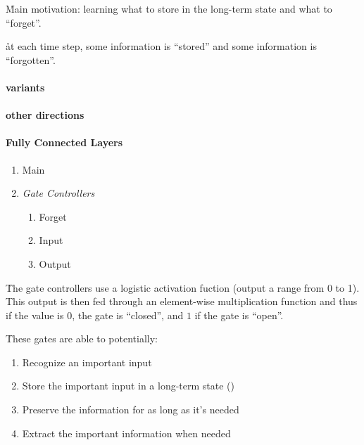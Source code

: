 \r{Main motivation: learning what to store in the long-term state and what to ``forget''.}

\r{at each time step, some information is ``stored'' and some information is ``forgotten''.}

\paragraph{variants}





\paragraph{other directions}


\paragraph{Fully Connected Layers}


\begin{enumerate}[noitemsep,topsep=0pt]
	\item Main
	\item \textit{Gate Controllers}
	\begin{enumerate}[noitemsep,topsep=0pt]
		\item Forget
		\item Input
		\item Output
	\end{enumerate}
\end{enumerate}

\r{The gate controllers use a logistic activation fuction (output a range from 0 to 1). This output is then fed through an element-wise multiplication function and thus if the value is $0$, the gate is ``closed'', and $1$ if the gate is ``open''.}

\r{These gates are able to potentially:}

\begin{enumerate}[noitemsep,topsep=0pt]
	\item Recognize an important input
	\item Store the important input in a long-term state ()
	\item Preserve the information for as long as it's needed
	\item Extract the important information when needed
\end{enumerate}


